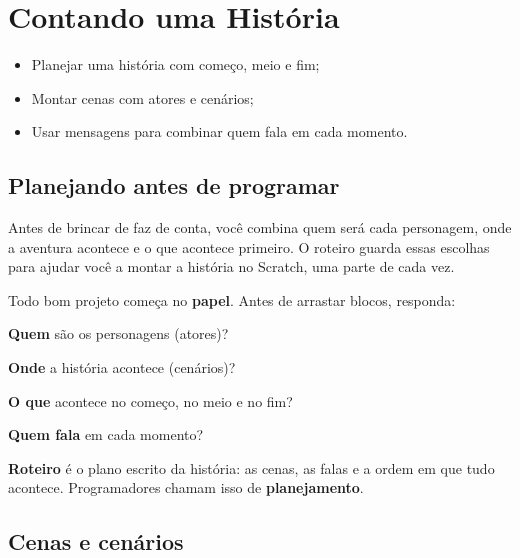 \chapter{Contando uma História}

\begin{objetivos}
\begin{itemize}
\item Planejar uma história com começo, meio e fim;
\item Montar cenas com atores e cenários;
\item Usar mensagens para combinar quem fala em cada momento.
\end{itemize}
\end{objetivos}

\section{Planejando antes de programar}

\begin{pensaassim}
Antes de brincar de faz de conta, você combina quem será cada personagem, onde a aventura acontece e o que acontece primeiro. O roteiro guarda essas escolhas para ajudar você a montar a história no Scratch, uma parte de cada vez.
\end{pensaassim}

Todo bom projeto começa no \textbf{papel}. Antes de arrastar blocos, responda:

\begin{passos}
\item \textbf{Quem} são os personagens (atores)?
\item \textbf{Onde} a história acontece (cenários)?
\item \textbf{O que} acontece no começo, no meio e no fim?
\item \textbf{Quem fala} em cada momento?
\end{passos}

\begin{vocabulario}
\textbf{Roteiro} é o plano escrito da história: as cenas, as falas e a ordem em que tudo acontece. Programadores chamam isso de \textbf{planejamento}.
\end{vocabulario}

\section{Cenas e cenários}

